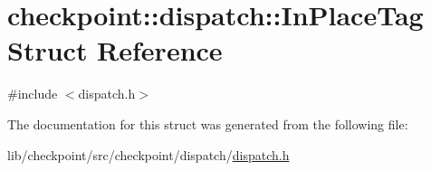 \hypertarget{structcheckpoint_1_1dispatch_1_1_in_place_tag}{}\section{checkpoint\+:\+:dispatch\+:\+:In\+Place\+Tag Struct Reference}
\label{structcheckpoint_1_1dispatch_1_1_in_place_tag}


{\ttfamily \#include $<$dispatch.\+h$>$}



The documentation for this struct was generated from the following file\+:\begin{DoxyCompactItemize}
\item 
lib/checkpoint/src/checkpoint/dispatch/\hyperlink{lib_2checkpoint_2src_2checkpoint_2dispatch_2dispatch_8h}{dispatch.\+h}\end{DoxyCompactItemize}
